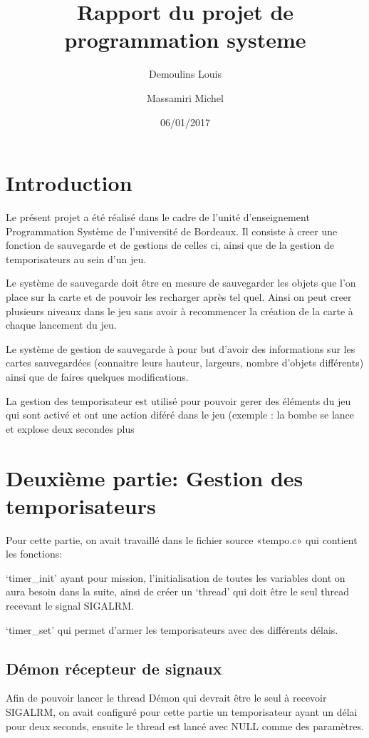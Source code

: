 \documentclass{article}
\title{Rapport du projet de programmation systeme}
\date{06/01/2017}
\author{Demoulins Louis \and Massamiri Michel}
\begin{document}
\maketitle


\newpage
\section{Introduction}

Le présent projet a été réalisé dans le cadre de l'unité d'enseignement Programmation Système de l'université de Bordeaux. Il consiste à creer une fonction de sauvegarde et de gestions de celles ci, ainsi que de la gestion de temporisateurs au sein d'un jeu.

Le système de sauvegarde doit être en mesure de sauvegarder les objets que l'on place sur la carte et de pouvoir les recharger après tel quel. Ainsi on peut creer plusieurs niveaux dans le jeu sans avoir à recommencer la création de la carte à chaque lancement du jeu.

Le système de gestion de sauvegarde à pour but d'avoir des informations sur les cartes sauvegardées (connaitre leurs hauteur, largeurs, nombre d'objets différents) ainsi que de faires quelques modifications.

La gestion des temporisateur est utilisé pour pouvoir gerer des éléments du jeu qui sont activé et ont une action diféré dans le jeu (exemple : la bombe se lance et explose deux secondes plus


\newpage
\section{Deuxième partie: Gestion des temporisateurs}

Pour cette partie, on avait travaillé dans le fichier source «tempo.c» qui contient les fonctions: 

‘timer_init’ ayant pour mission, l’initialisation de toutes les variables dont on aura besoin dans la suite, ainsi de créer un ‘thread’ qui doit être le seul thread recevant le signal SIGALRM. 

‘timer_set’ qui permet d’armer les temporisateurs avec des différents délais.
\subsection{Démon récepteur de signaux}

Afin de pouvoir lancer le thread Démon qui devrait être le seul à recevoir SIGALRM, on avait configuré pour cette partie un temporisateur ayant un délai pour deux seconds, ensuite le thread est lancé avec NULL comme des paramètres.
\end{document}
